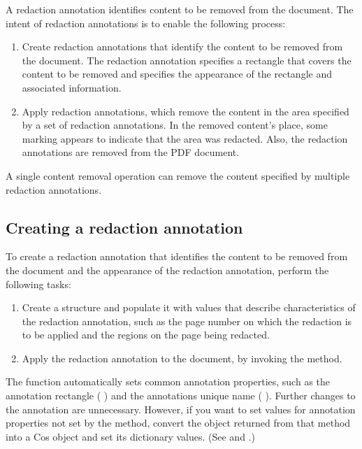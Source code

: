 \documentclass[letterpaper,12pt,english,openany,oneside]{sphinxmanual}
\begin{document}
A redaction annotation identifies content to be removed from the document. The intent of redaction annotations is to enable the following process:
\begin{enumerate}
%
\item {} 
Create redaction annotations that identify the content to be removed from the document. The redaction annotation specifies a rectangle that covers the content to be removed and specifies the appearance of the rectangle and associated information.

\item {} 
Apply redaction annotations, which remove the content in the area specified by a set of redaction annotations. In the removed content’s place, some marking appears to indicate that the area was redacted. Also, the redaction annotations are removed from the PDF document.

\end{enumerate}

A single content removal operation can remove the content specified by multiple redaction annotations.


\subsection{Creating a redaction annotation}
\label{\detokenize{Plugins_Annotations:creating-a-redaction-annotation}}
To create a redaction annotation that identifies the content to be removed from the document and the appearance of the redaction annotation, perform the following tasks:
\begin{enumerate}
%
\item {} 
Create a  structure and populate it with values that describe characteristics of the redaction annotation, such as the page number on which the redaction is to be applied and the regions on the page being redacted.

\item {} 
Apply the redaction annotation to the document, by invoking the  method.

\end{enumerate}

The  function automatically sets common annotation properties, such as the annotation rectangle ( ) and the annotations unique name ( ). Further changes to the annotation are unnecessary. However, if you want to set values for annotation properties not set by the  method, convert the  object returned from that method into a Cos object and set its dictionary values. (See  and .)
\end{document}
